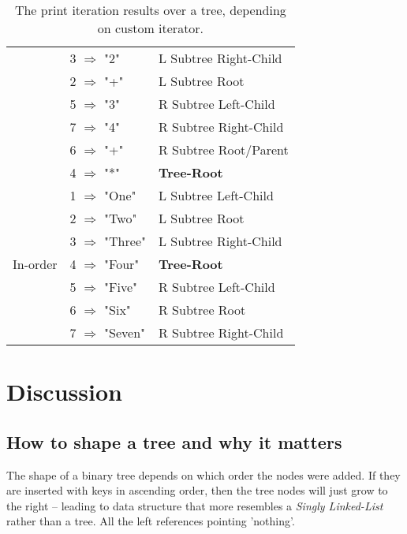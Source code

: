 \documentclass[a4paper, 11pt]{article}
\begin{document}
\begin{table}[h]
\begin{tabular}{|l|l|l|}
                                      & 3 $\Rightarrow$ "2"         & L Subtree Right-Child\\
                                      & 2 $\Rightarrow$ "+"         & L Subtree Root\\
                                      & 5 $\Rightarrow$ "3"         & R Subtree Left-Child\\
                                      & 7 $\Rightarrow$ "4"         & R Subtree Right-Child\\
                                      & 6 $\Rightarrow$ "+"         & R Subtree Root/Parent\\\
                                      & 4 $\Rightarrow$ "*"         & \textbf{Tree-Root} \\
        \hline
        \multirow{7}{*}{In-order}     & 1 $\Rightarrow$ "One"       & L Subtree Left-Child\\
                                      & 2 $\Rightarrow$ "Two"       & L Subtree Root\\
                                      & 3 $\Rightarrow$ "Three"     & L Subtree Right-Child\\
                                      & 4 $\Rightarrow$ "Four"      & \textbf{Tree-Root} \\
                                      & 5 $\Rightarrow$ "Five"      & R Subtree Left-Child\\
                                      & 6 $\Rightarrow$ "Six"       & R Subtree Root\\
                                      & 7 $\Rightarrow$ "Seven"     & R Subtree Right-Child\\
        \hline
    \end{tabular}
    \caption{The print iteration results over a tree, depending on custom iterator.}
    \label{tab:traversalalgorithms}
    \end{table}
    \clearpage
    \section*{Discussion}
    \label{sec:discussion}
    \subsection*{How to shape a tree and why it matters}
    The shape of a binary tree depends on which order the nodes were
    added. If they are inserted with keys in ascending order,
    then the tree nodes will just grow to the right -- leading 
    to data structure that more resembles a \emph{Singly Linked-List} rather
    than a tree. All the left references pointing 'nothing'.
\end{document}
